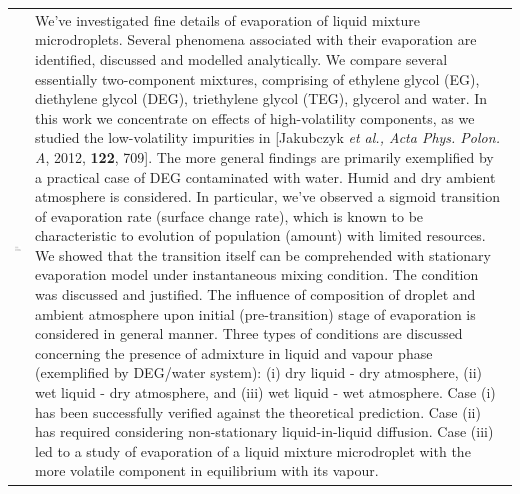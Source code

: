 \documentclass[twoside,twocolumn,9pt]{article}
\begin{document}
\begin{@twocolumnfalse}
\begin{tabular}{m{4.5cm} p{13.5cm} }
\includegraphics{head_foot/dates} & \noindent\normalsize{We've investigated fine details of evaporation of liquid mixture microdroplets. Several phenomena associated with their evaporation are identified, discussed and modelled analytically. We compare several essentially two-component mixtures, comprising of ethylene glycol (EG), diethylene glycol (DEG), triethylene glycol (TEG), glycerol and water. In this work we concentrate on effects of high-volatility components, as we studied the low-volatility impurities in [Jakubczyk \textit{et al., Acta Phys. Polon. A}, 2012, \textbf{122}, 709]. The more general findings are primarily exemplified by a practical case of DEG contaminated with water. Humid and dry ambient atmosphere is considered. In particular, we've observed a sigmoid transition of evaporation rate (surface change rate), which is known to be characteristic to evolution of population (amount) with limited resources. We showed that the transition itself can be comprehended with stationary evaporation model under instantaneous mixing condition. The condition was discussed and justified. The influence of composition of droplet and ambient atmosphere upon initial (pre-transition) stage of evaporation is considered in general manner. Three types of conditions are discussed concerning the presence of admixture in liquid and vapour phase (exemplified by DEG/water system): (i) dry liquid - dry atmosphere, (ii) wet liquid - dry atmosphere, and (iii) wet liquid - wet atmosphere. Case (i) has been successfully verified against the theoretical prediction. Case (ii) has required considering non-stationary liquid-in-liquid diffusion. Case (iii) led to a study of evaporation of a liquid mixture microdroplet with the more volatile component in equilibrium with its vapour.} \\

\end{tabular}

 \end{@twocolumnfalse} \vspace{0.6cm}
\end{document}
